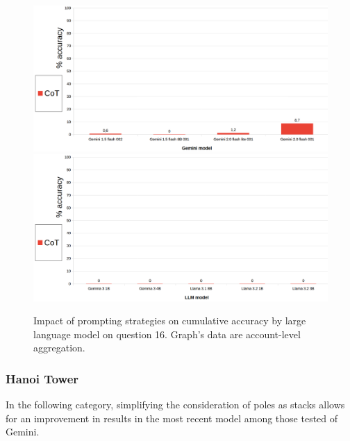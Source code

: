 \documentclass[12pt]{article}
\begin{document}
\begin{figure}[H]
    \centering
            \includegraphics[width=1\textwidth]{q304Gemini.png}
            \includegraphics[width=1\textwidth]{q304Other.png}
    \caption[Accuracy on Question 16 by LLM]{Impact of prompting strategies on cumulative accuracy by large language model on question 16. Graph's data are account-level aggregation.}
    \end{figure} 

\vspace{2cm}
\subsubsection{Hanoi Tower} %
In the following category, simplifying the consideration of poles as stacks allows for an improvement in results in the most recent model among those tested of Gemini.\\

\end{document}
